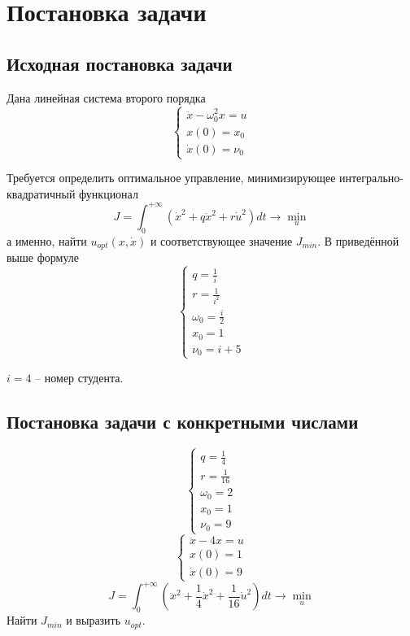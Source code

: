 \documentclass[a4paper,12pt]{article}
\begin{document}


\section{Постановка задачи}
\subsection{Исходная постановка задачи}

Дана линейная система второго порядка
\begin{equation}\label{eq:task}
    \begin{cases}
        \ddot x - \omega_0^2 x = u \\
        x(0) = x_0 \\
        \dot x(0) = \nu_0
    \end{cases}
\end{equation}

Требуется определить оптимальное управление, минимизирующее интегрально-квадратичный функционал
\begin{equation}\label{eq:func}
    J = \int_{0}^{+ \infty} \left( \dot x^2 + q \ddot x^2 + r \dot u^2 \right) dt \to \min_u
\end{equation}
а именно, найти $ u_{opt}(x, \dot x) $ и соответствующее значение $ J_{min} $.
В приведённой выше формуле
\[ \begin{cases}
    q = \frac{1}{i} \\
    r = \frac{1}{i^2} \\
    \omega_0 = \frac{i}{2} \\
    x_0 = 1 \\
    \nu_0 = i + 5
\end{cases} \]

$ i=4 $ -- номер студента.

\subsection{Постановка задачи с конкретными числами}

\[ \begin{cases}
    q = \frac{1}{4} \\
    r = \frac{1}{16} \\
    \omega_0 = 2 \\
    x_0 = 1 \\
    \nu_0 = 9
\end{cases} \]
\[ \begin{cases}
    \ddot x - 4 x = u \\
    x(0) = 1 \\
    \dot x(0) = 9
\end{cases} \]
\[ J = \int_{0}^{+ \infty} \left( \ddot x^2 + \frac{1}{4} \dot x^2 + \frac{1}{16} \dot u^2 \right) dt \to \min_u  \]
Найти $ J_{min} $ и выразить $ u_{opt} $.
\end{document}
